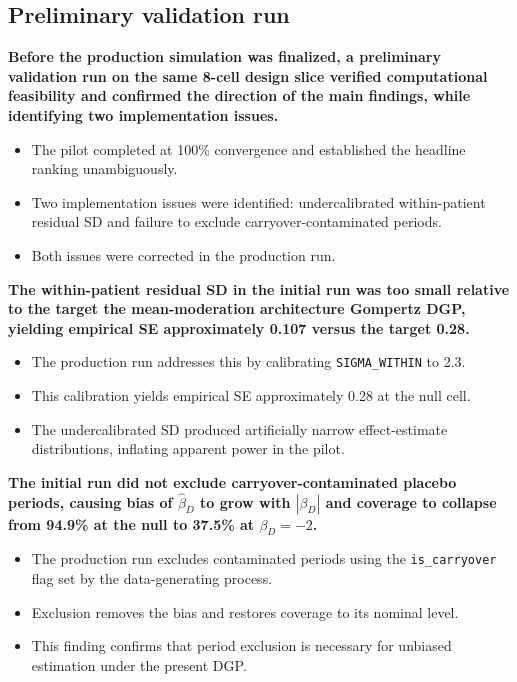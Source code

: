 \documentclass[
  11pt,
]{article}
\begin{document}
\subsection{Preliminary validation run}\label{preliminary-validation-run}

\textbf{Before the production simulation was finalized, a preliminary validation run on the same 8-cell design slice verified computational feasibility and confirmed the direction of the main findings, while identifying two implementation issues.}

\begin{itemize}\setlength{\itemsep}{2pt}\setlength{\parskip}{0pt}
\item The pilot completed at 100\% convergence and established the headline ranking unambiguously.
\item Two implementation issues were identified: undercalibrated within-patient residual SD and failure to exclude carryover-contaminated periods.
\item Both issues were corrected in the production run.
\end{itemize}

\textbf{The within-patient residual SD in the initial run was too small relative to the target the mean-moderation architecture Gompertz DGP, yielding empirical SE approximately 0.107 versus the target 0.28.}

\begin{itemize}\setlength{\itemsep}{2pt}\setlength{\parskip}{0pt}
\item The production run addresses this by calibrating \texttt{SIGMA\_WITHIN} to 2.3.
\item This calibration yields empirical SE approximately 0.28 at the null cell.
\item The undercalibrated SD produced artificially narrow effect-estimate distributions, inflating apparent power in the pilot.
\end{itemize}

\textbf{The initial run did not exclude carryover-contaminated placebo periods, causing bias of $\hat{\beta}_D$ to grow with $|\beta_D|$ and coverage to collapse from 94.9\% at the null to 37.5\% at $\beta_D = -2$.}

\begin{itemize}\setlength{\itemsep}{2pt}\setlength{\parskip}{0pt}
\item The production run excludes contaminated periods using the \texttt{is\_carryover} flag set by the data-generating process.
\item Exclusion removes the bias and restores coverage to its nominal level.
\item This finding confirms that period exclusion is necessary for unbiased estimation under the present DGP.
\end{itemize}
\end{document}
